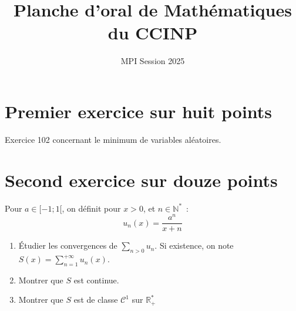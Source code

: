 \documentclass[11pt]{article}
\title{Planche d'oral de Mathématiques du CCINP}
\author{MPI Session 2025}
\date{}
\newcommand{\R}{\mathbb{R}}
\newcommand{\N}{\mathbb{N}}
\begin{document}
\maketitle

\section*{Premier exercice sur huit points}

    Exercice 102 concernant le minimum de variables aléatoires.


\section*{Second exercice sur douze points}

Pour $a \in [-1;1[$, on définit pour $x>0$, et $n \in \N^*$~:
$$u_n(x)=\frac{a^n}{x+n}$$
\begin{enumerate}[label=\textbf{\arabic*.}]
    \item Étudier les convergences de $\sum_{n > 0}u_n$. Si existence, on note $S(x) = \sum_{n=1}^{+\infty}u_n(x)$.
    \item Montrer que $S$ est continue.
    \item Montrer que $S$ est de classe $\mathcal{C}^1$ sur $\R_+^*$
\end{enumerate}
\end{document}
